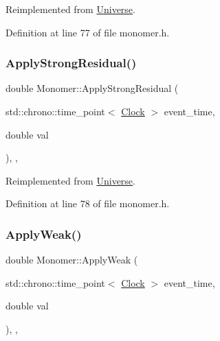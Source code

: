 Reimplemented from \mbox{\hyperlink{class_universe_a62789bcff84bd750b0366004381e2fdd}{Universe}}.



Definition at line 77 of file monomer.\+h.

\mbox{\label{class_monomer_a921f7add2d446b8670513220ace6c4b2}} 
\subsubsection{\texorpdfstring{Apply\+Strong\+Residual()}{ApplyStrongResidual()}}
{\footnotesize\ttfamily double Monomer\+::\+Apply\+Strong\+Residual (\begin{DoxyParamCaption}\item[{std\+::chrono\+::time\+\_\+point$<$ \mbox{\hyperlink{universe_8h_a0ef8d951d1ca5ab3cfaf7ab4c7a6fd80}{Clock}} $>$}]{event\+\_\+time,  }\item[{double}]{val }\end{DoxyParamCaption})\hspace{0.3cm}{\ttfamily [inline]}, {\ttfamily [final]}, {\ttfamily [virtual]}}



Reimplemented from \mbox{\hyperlink{class_universe_af7becebb347be9a85541d96a3eca1ca7}{Universe}}.



Definition at line 78 of file monomer.\+h.

\mbox{\label{class_monomer_a176a1a4dfed1eaddc6637bbfd2660aba}} 
\subsubsection{\texorpdfstring{Apply\+Weak()}{ApplyWeak()}}
{\footnotesize\ttfamily double Monomer\+::\+Apply\+Weak (\begin{DoxyParamCaption}\item[{std\+::chrono\+::time\+\_\+point$<$ \mbox{\hyperlink{universe_8h_a0ef8d951d1ca5ab3cfaf7ab4c7a6fd80}{Clock}} $>$}]{event\+\_\+time,  }\item[{double}]{val }\end{DoxyParamCaption})\hspace{0.3cm}{\ttfamily [inline]}, {\ttfamily [final]}, {\ttfamily [virtual]}}



